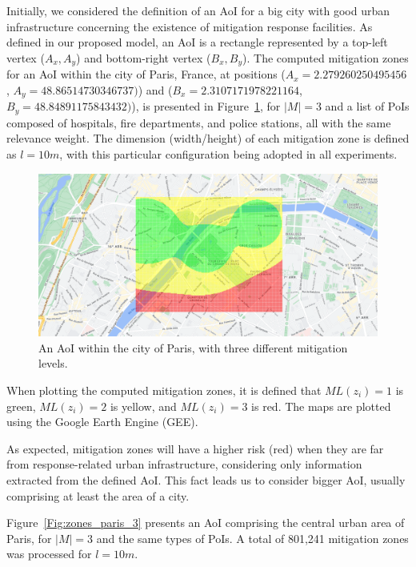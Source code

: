 \begin{refsection}
Initially, we considered the definition of an AoI for a big city with good urban infrastructure concerning the existence of mitigation response facilities. As defined in our proposed model, an AoI is a rectangle represented by a top-left vertex ($A_x,A_y$) and bottom-right vertex ($B_x,B_y$). The computed mitigation zones for an AoI within the city of Paris, France, at positions ($A_x = 2.279260250495456$, $A_y = 48.86514730346737)$) and ($B_x = 2.3107171978221164$, $B_y = 48.84891175843432)$), is presented in Figure~\ref{Fig:zones_paris_0}, for $|M|=3$ and a list of PoIs composed of hospitals, fire departments, and police stations, all with the same relevance weight. The dimension (width/height) of each mitigation zone is defined as $l = 10m$, with this particular configuration being adopted in all experiments.

\begin{figure}[ht!]
  \centering
  \includegraphics[width=0.9\linewidth]{Chapters/2-EDUs/images/eiffel_M3.png}
  \caption{An AoI within the city of Paris, with three different mitigation levels.}\label{Fig:zones_paris_0}
\end{figure}

When plotting the computed mitigation zones, it is defined that $ML(z_i)=1$ is green, $ML(z_i)=2$ is yellow, and $ML(z_i)=3$ is red. The maps are plotted using the Google Earth Engine (GEE).

As expected, mitigation zones will have a higher risk (red) when they are far from response-related urban infrastructure, considering only information extracted from the defined AoI. This fact leads us to consider bigger AoI, usually comprising at least the area of a city.

Figure~\ref{Fig:zones_paris_3} presents an AoI comprising the central urban area of Paris, for $|M|=3$ and the same types of PoIs. A total of 801,241 mitigation zones was processed for $l = 10m$.


\end{refsection}
